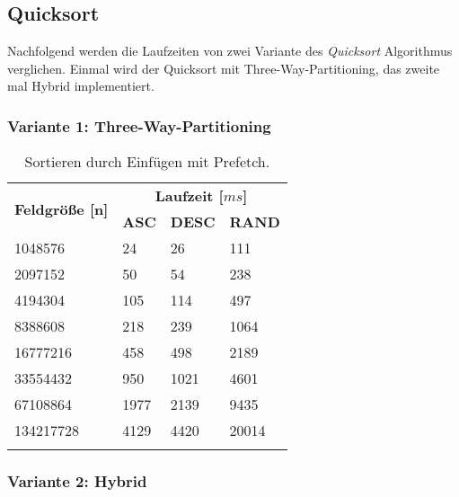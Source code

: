 \subsection{Quicksort}

Nachfolgend werden die Laufzeiten von zwei Variante des \textit{Quicksort} Algorithmus verglichen. Einmal wird der Quicksort mit Three-Way-Partitioning, das zweite mal Hybrid implementiert.

\subsubsection{Variante 1: Three-Way-Partitioning}

\begin{center}
	\begin{longtable}{|p{5cm}|p{3cm}|p{3cm}|p{3cm}|}
		\hline
		
		\multirow{2}{5cm}{\centering \textbf{Feldgröße [n]}} & \multicolumn{3}{|c|}{ \textbf{Laufzeit [$ms$]}} \\\cline{2-4}
		& \multicolumn{1}{|c|}{\textbf{ASC}} & \multicolumn{1}{|c|}{\textbf{DESC}} &\multicolumn{1}{|c|}{\textbf{RAND}} \\
		\hhline{|=|=|=|=|}
		
		1048576 & 24 & 26 & 111\\
		\hline
		2097152 & 50 & 54 & 238\\
		\hline
		4194304 & 105 & 114 & 497\\
		\hline
		8388608 & 218 & 239 & 1064\\
		\hline
		16777216 & 458 & 498 & 2189\\
		\hline
		33554432 & 950 & 1021 & 4601\\
		\hline
		67108864 & 1977 & 2139 & 9435\\
		\hline
		134217728 & 4129 & 4420 & 20014\\
		\hline
		
		\caption{Sortieren durch Einfügen mit Prefetch.}
		\label{tab:insertionsort-v2}
	\end{longtable}
\end{center}

\subsubsection{Variante 2: Hybrid}

